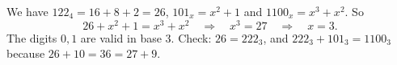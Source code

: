 We have $122_4=16+8+2=26$, $101_x=x^2+1$ and $1100_x=x^3+x^2$. So
\[26+x^2+1=x^3+x^2\quad\Longrightarrow\quad x^3=27\quad\Longrightarrow\quad x=\boxed{3}.\]
The digits $0,1$ are valid in base $3$. Check: $26=222_3$, and $222_3+101_3=1100_3$ because $26+10=36=27+9$.
